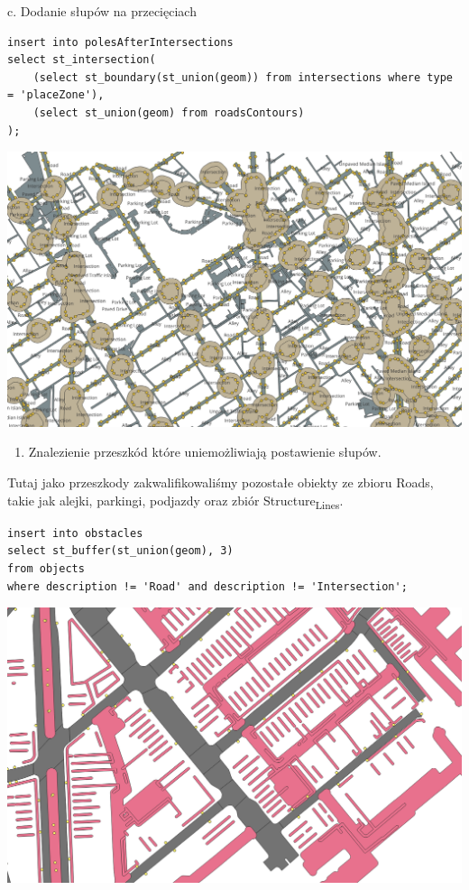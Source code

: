 \documentclass[11pt]{article}
\begin{document}
c. Dodanie słupów na przecięciach 

\begin{verbatim}
insert into polesAfterIntersections 
select st_intersection(
    (select st_boundary(st_union(geom)) from intersections where type = 'placeZone'), 
    (select st_union(geom) from roadsContours)
);
\end{verbatim}

\begin{center}
\includegraphics[width=.9\linewidth]{./img/5.png}
\end{center}

\begin{enumerate}
\item Znalezienie przeszkód które uniemożliwiają postawienie słupów.
\end{enumerate}

Tutaj jako przeszkody zakwalifikowaliśmy pozostałe obiekty ze zbioru Roads, takie jak alejki, parkingi, podjazdy oraz zbiór Structure\textsubscript{Lines}.

\begin{verbatim}
insert into obstacles 
select st_buffer(st_union(geom), 3) 
from objects 
where description != 'Road' and description != 'Intersection';
\end{verbatim}

\begin{center}
\includegraphics[width=.9\linewidth]{./img/6.png}
\end{center}
\end{document}
